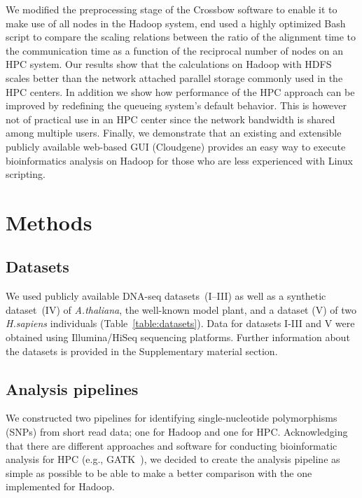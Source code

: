 \documentclass[10pt]{article}
\begin{document}
We modified the preprocessing stage of the Crossbow software to enable it to make use of all nodes in the Hadoop system, end used a highly optimized Bash script to compare the scaling relations between the ratio of the alignment time to the communication time as a function of the reciprocal number of nodes on an HPC system. 
Our results show that the calculations on Hadoop with HDFS scales better than the network attached parallel storage commonly used in the HPC centers.
In addition we show how performance of the HPC approach can be improved by redefining the queueing system's default behavior. This is however not of practical use in an HPC center since the network bandwidth is shared among multiple users. Finally, we demonstrate that an existing and extensible publicly available web-based GUI (Cloudgene) provides an easy way to execute bioinformatics analysis on Hadoop for those who are less experienced with Linux scripting.









\section*{Methods}

\subsection*{Datasets}
We used publicly available DNA-seq datasets~(I--III) as well as a synthetic dataset~(IV) of {\it A.thaliana}, the well-known model plant, and a dataset (V) of two {\it H.sapiens} individuals (Table~\ref{table:datasets}). Data for datasets I-III and V were obtained using Illumina/HiSeq sequencing platforms. Further information about the datasets is provided in the Supplementary material section.


\subsection*{Analysis pipelines}
We constructed two pipelines for identifying single-nucleotide polymorphisms (SNPs) from short read data; one for Hadoop and one for HPC.
Acknowledging that there are different approaches and software for conducting bioinformatic analysis for HPC (e.g., GATK~\cite{gatk}), we decided to create the analysis pipeline as simple as possible to be able to make a better comparison with the one implemented for Hadoop.
\end{document}
